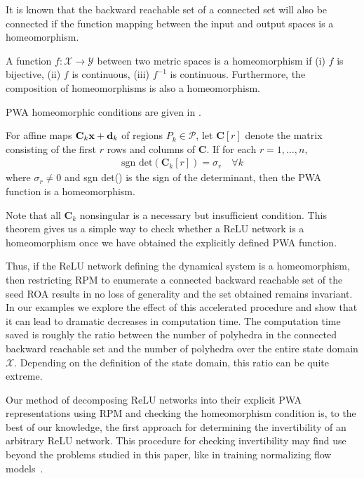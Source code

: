 It is known that the backward reachable set of a connected set will also be connected if the function mapping between the input and output spaces is a homeomorphism.
\begin{definition}[Homeomorphism] \label{def:homeo}
A function $f: \mathcal{X} \rightarrow \mathcal{Y}$ between two metric spaces is a homeomorphism if (i) $f$ is bijective, (ii) $f$ is continuous, (iii) $f^{-1}$ is continuous.
Furthermore, the composition of homeomorphisms is also a homeomorphism.
\end{definition}
PWA homeomorphic conditions are given in \cite{homeo2}.
\begin{theorem}
For affine maps $\mathbf{C}_k\mathbf{x} + \mathbf{d}_k$ of regions $P_k \in \mathcal{P}$, let $\mathbf{C}[r]$ denote the matrix consisting of the first $r$ rows and columns of $\mathbf{C}$. If for each $r = 1, \ldots, n$,
\begin{align}
   \text{sgn det}(\mathbf{C}_k[r]) = \sigma_r \quad \forall k
\end{align}
where $\sigma_r \neq 0$ and sgn det() is the sign of the determinant, then the PWA function is a homeomorphism. 
\end{theorem}
Note that all $\mathbf{C}_k$ nonsingular is a necessary but insufficient condition. 
This theorem gives us a simple way to check whether a ReLU network is a homeomorphism once we have obtained the explicitly defined PWA function. 

Thus, if the ReLU network defining the dynamical system is a homeomorphism, then restricting RPM to enumerate a connected backward reachable set of the seed ROA results in no loss of generality and the set obtained remains invariant.
In our examples we explore the effect of this accelerated procedure and show that it can lead to dramatic decreases in computation time.
The computation time saved is roughly the ratio between the number of polyhedra in the connected backward reachable set and the number of polyhedra over the entire state domain $\mathcal{X}$.
Depending on the definition of the state domain, this ratio can be quite extreme.

Our method of decomposing ReLU networks into their explicit PWA representations using RPM and checking the homeomorphism condition is, to the best of our knowledge, the first approach for determining the invertibility of an arbitrary ReLU network. 
This procedure for checking invertibility may find use beyond the problems studied in this paper, like in training normalizing flow models~\cite{papamakarios2021normalizing}.

